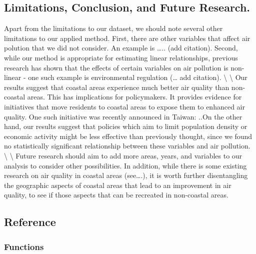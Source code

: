 \documentclass[
]{article}
\begin{document}
\hypertarget{limitations-conclusion-and-future-research.}{%
\subsection{Limitations, Conclusion, and Future
Research.}\label{limitations-conclusion-and-future-research.}}

Apart from the limitations to our dataset, we should note several other
limitations to our applied method. First, there are other variables that
affect air polution that we did not consider. An example is \ldots..
(add citation). Second, while our method is appropriate for estimating
linear relationships, previous research has shown that the effects of
certain variables on air pollution is non-linear - one such example is
environmental regulation (\ldots{} add citation). \textbackslash{}
\textbackslash{} Our results suggest that coastal areas experience much
better air quality than non-coastal areas. This has implications for
policymakers. It provides evidence for initiatives that move residents
to coastal areas to expose them to enhanced air quality. One such
initiative was recently announced in Taiwan: ..On the other hand, our
results suggest that policies which aim to limit population density or
economic activity might be less effective than previously thought, since
we found no statistically significant relationship between these
variables and air pollution. \textbackslash{} \textbackslash{} Future
research should aim to add more areas, years, and variables to our
analysis to consider other possibilities. In addition, while there is
some existing research on air quality in coastal areas (see\ldots.), it
is worth further disentangling the geographic aspects of coastal areas
that lead to an improvement in air quality, to see if those aspects that
can be recreated in non-coastal areas.

\hypertarget{Reference}{%
\subsection{Reference}\label{Reference}}

\hypertarget{functions}{%
\subsubsection{Functions}\label{functions}}
\end{document}

